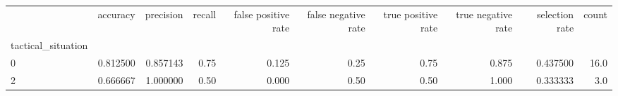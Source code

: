 \begin{tabular}{lrrrrrrrrr}
\toprule
{} &  accuracy &  precision &  recall &  false positive rate &  false negative rate &  true positive rate &  true negative rate &  selection rate &  count \\
tactical\_situation &           &            &         &                      &                      &                     &                     &                 &        \\
\midrule
0                  &  0.812500 &   0.857143 &    0.75 &                0.125 &                 0.25 &                0.75 &               0.875 &        0.437500 &   16.0 \\
2                  &  0.666667 &   1.000000 &    0.50 &                0.000 &                 0.50 &                0.50 &               1.000 &        0.333333 &    3.0 \\
\bottomrule
\end{tabular}
